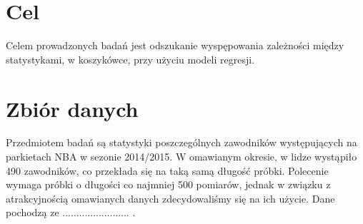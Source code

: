\documentclass[11pt,a4paper]{article}
\author{Kamil Zawistowski, Michał Cerazy}
\begin{document}
\tableofcontents
\newpage
\section{Cel}
Celem prowadzonych badań jest odszukanie wyspępowania zależności między statystykami, w koszykówce, przy użyciu modeli regresji. 

\section{Zbiór danych}
Przedmiotem badań są statystyki poszczególnych zawodników występujących na parkietach NBA w sezonie 2014/2015. W omawianym okresie, w lidze wystąpiło 490 zawodników, co przekłada się na taką samą długość próbki. Polecenie wymaga próbki o długości co najmniej 500 pomiarów, jednak w związku z atrakcyjnością omawianych danych zdecydowaliśmy się na ich użycie. Dane pochodzą ze ........................ . 
\end{document}
